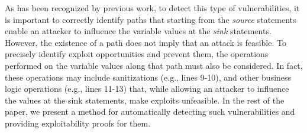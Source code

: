 As has been recognized by previous work, to detect this type of vulnerabilities, it is important to correctly identify paths that starting from the \textit{source} statements enable an attacker to influence the variable values at the \textit{sink} statements. However, the existence of a path does not imply that an attack is feasible. To precisely identify exploit opportunities and prevent them, the operations performed on the variable values along that path must also be considered. In fact, these operations may include  sanitizations (e.g., lines 9-10), and other business logic operations (e.g., lines 11-13) that, while allowing an attacker to influence the values at the sink statements, make exploits unfeasible. In the rest of the paper, we present a method for automatically detecting such vulnerabilities and providing exploitability proofs for them. 

